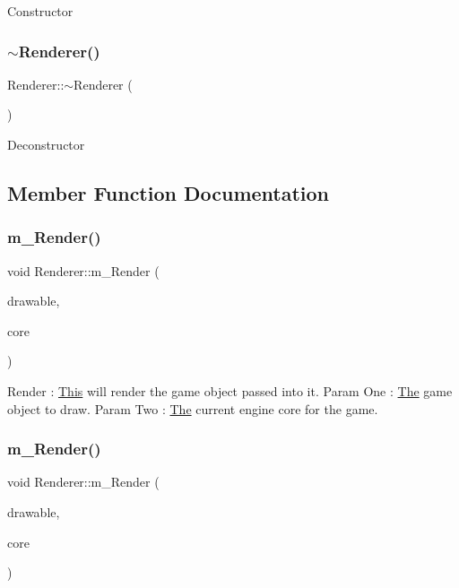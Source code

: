 Constructor \mbox{\label{class_renderer_afeee408862d5bd6255a6882d47e6d5cd}} 
\subsubsection{\texorpdfstring{$\sim$\+Renderer()}{~Renderer()}}
{\footnotesize\ttfamily Renderer\+::$\sim$\+Renderer (\begin{DoxyParamCaption}{ }\end{DoxyParamCaption})}

Deconstructor 

\subsection{Member Function Documentation}
\mbox{\label{class_renderer_a5413bf99fb5a945ca2be17b83cbd43e5}} 
\subsubsection{\texorpdfstring{m\+\_\+\+Render()}{m\_Render()}\hspace{0.1cm}{\footnotesize\ttfamily [1/3]}}
{\footnotesize\ttfamily void Renderer\+::m\+\_\+\+Render (\begin{DoxyParamCaption}\item[{\mbox{\hyperlink{class_game_object}{Game\+Object}} $\ast$}]{drawable,  }\item[{\mbox{\hyperlink{class_i_engine_core}{I\+Engine\+Core}} $\ast$}]{core }\end{DoxyParamCaption})}

Render \+: \mbox{\hyperlink{class_this}{This}} will render the game object passed into it. Param One \+: \mbox{\hyperlink{class_the}{The}} game object to draw. Param Two \+: \mbox{\hyperlink{class_the}{The}} current engine core for the game. \mbox{\label{class_renderer_a6852a562bd5a7ed130c16bb1d1eaebdc}} 
\subsubsection{\texorpdfstring{m\+\_\+\+Render()}{m\_Render()}\hspace{0.1cm}{\footnotesize\ttfamily [2/3]}}
{\footnotesize\ttfamily void Renderer\+::m\+\_\+\+Render (\begin{DoxyParamCaption}\item[{std\+::vector$<$ \mbox{\hyperlink{class_game_object}{Game\+Object}} $>$ \&}]{drawable,  }\item[{\mbox{\hyperlink{class_i_engine_core}{I\+Engine\+Core}} $\ast$}]{core }\end{DoxyParamCaption})}


